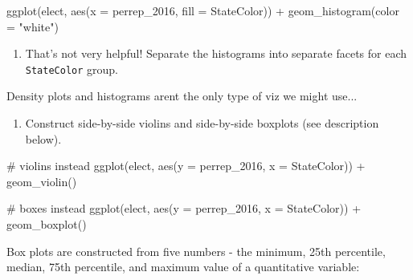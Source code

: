 \documentclass[
  letterpaper,
  DIV=11,
  numbers=noendperiod]{scrreprt}
\newenvironment{Shaded}{\begin{snugshade}}{\end{snugshade}}
\newcommand{\AttributeTok}[1]{\textcolor[rgb]{0.40,0.45,0.13}{#1}}
\newcommand{\CommentTok}[1]{\textcolor[rgb]{0.37,0.37,0.37}{#1}}
\newcommand{\FunctionTok}[1]{\textcolor[rgb]{0.28,0.35,0.67}{#1}}
\newcommand{\NormalTok}[1]{\textcolor[rgb]{0.00,0.23,0.31}{#1}}
\newcommand{\SpecialCharTok}[1]{\textcolor[rgb]{0.37,0.37,0.37}{#1}}
\newcommand{\StringTok}[1]{\textcolor[rgb]{0.13,0.47,0.30}{#1}}
\providecommand{\tightlist}{%
  \setlength{\itemsep}{0pt}\setlength{\parskip}{0pt}}\usepackage{longtable,booktabs,array}
\begin{document}
\begin{Shaded}
\begin{Highlighting}[]
\FunctionTok{ggplot}\NormalTok{(elect, }\FunctionTok{aes}\NormalTok{(}\AttributeTok{x =}\NormalTok{ perrep\_2016, }\AttributeTok{fill =}\NormalTok{ StateColor)) }\SpecialCharTok{+}
\FunctionTok{geom\_histogram}\NormalTok{(}\AttributeTok{color =} \StringTok{"white"}\NormalTok{)}
\end{Highlighting}
\end{Shaded}

\begin{enumerate}
\def\labelenumi{\alph{enumi}.}
\setcounter{enumi}{1}
\tightlist
\item
  That's not very helpful! Separate the histograms into separate facets
  for each \texttt{StateColor} group.
\end{enumerate}

\begin{Shaded}
\begin{Highlighting}[]
\NormalTok{Density plots and histograms aren\textquotesingle{}t the only type of viz we might use...    }
\end{Highlighting}
\end{Shaded}

\begin{enumerate}
\def\labelenumi{\alph{enumi}.}
\tightlist
\item
  Construct side-by-side violins and side-by-side boxplots (see
  description below).
\end{enumerate}

\begin{Shaded}
\begin{Highlighting}[]
\CommentTok{\# violins instead}
\FunctionTok{ggplot}\NormalTok{(elect, }\FunctionTok{aes}\NormalTok{(}\AttributeTok{y =}\NormalTok{ perrep\_2016, }\AttributeTok{x =}\NormalTok{ StateColor)) }\SpecialCharTok{+}
  \FunctionTok{geom\_violin}\NormalTok{()}

\CommentTok{\# boxes instead}
\FunctionTok{ggplot}\NormalTok{(elect, }\FunctionTok{aes}\NormalTok{(}\AttributeTok{y =}\NormalTok{ perrep\_2016, }\AttributeTok{x =}\NormalTok{ StateColor)) }\SpecialCharTok{+}
  \FunctionTok{geom\_boxplot}\NormalTok{()}
\end{Highlighting}
\end{Shaded}

Box plots are constructed from five numbers - the minimum, 25th
percentile, median, 75th percentile, and maximum value of a quantitative
variable:
\end{document}
